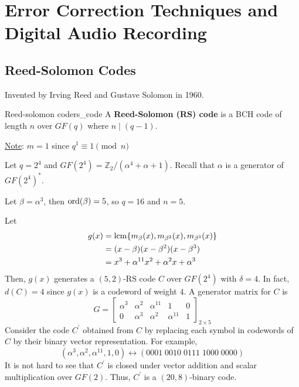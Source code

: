 \chapter{Error Correction Techniques and Digital Audio Recording}
\section{Reed-Solomon Codes}
Invented by Irving Reed and Gustave Solomon in 1960.

\begin{Definition}{Reed-solomon code}{rs_code}
    A \textbf{Reed-Solomon (RS) code} is a BCH code
    of length $ n $ over $ GF(q) $ where $ n\mid (q-1) $.

    \underline{Note}: $ m=1 $ since $ q^1\equiv 1\pmod{n} $
\end{Definition}

\begin{Example}{}{}
    Let $ q=2^4 $ and $ GF(2^4)=\mathbb{Z}_2/(\alpha^4+\alpha+1) $.
    Recall that $ \alpha $ is a generator of $ GF(2^4)^* $.

    Let $ \beta=\alpha^3 $, then $ \operatorname{ord}(\beta)=5 $, so $ q=16 $
    and $ n=5 $.

    Let
    \begin{align*}
        g(x) & =\operatorname{lcm} \{m_{\beta}(x),m_{\beta^2}(x),m_{\beta^3}(x)\} \\
             & =(x-\beta)(x-\beta^2)(x-\beta^3)                       \\
             & =x^3+\alpha^{11}x^2+\alpha^2x+\alpha^3
    \end{align*}
    Then, $ g(x) $ generates a $ (5,2) $-RS code $ C $ over $ GF(2^4) $
    with $ \delta=4 $. In fact, $ d(C)=4 $ since $ g(x) $
    is a codeword of weight $ 4 $. A generator matrix for $ C $ is
    \[ G=
        \begin{bmatrix}
            \alpha^3 & \alpha^2 & \alpha^{11} & 1           & 0 \\
            0        & \alpha^3 & \alpha^2    & \alpha^{11} & 1
        \end{bmatrix}_{2\times 5} \]
    Consider the code $ C^{\prime} $ obtained from $ C $
    by replacing each symbol in codewords of $ C $ by their binary vector representation.
    For example,
    \[ (\alpha^3,\alpha^2,\alpha^{11},1,0)\longleftrightarrow (0001\; 0010\; 0111\; 1000\; 0000) \]
    It is not hard to see that $ C^{\prime} $ is closed under vector addition and scalar
    multiplication over $ GF(2) $. Thus, $ C^{\prime} $ is a $ (20,8) $-binary code.
\end{Example}

